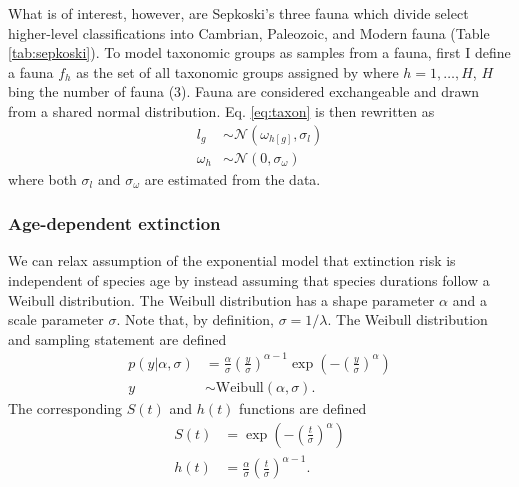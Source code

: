 \documentclass[12pt,letterpaper]{article}
\begin{document}
What is of interest, however, are Sepkoski's three fauna \citep{SepkoskiJr.1981a} which divide select higher-level classifications into Cambrian, Paleozoic, and Modern fauna (Table \ref{tab:sepkoski}). To model taxonomic groups as samples from a fauna, first I define a fauna \(f_{h}\) as the set of all taxonomic groups assigned by \citet{SepkoskiJr.1981a} where \(h = 1, \dots, H\), \(H\) bing the number of fauna (3). Fauna are considered exchangeable and drawn from a shared normal distribution. Eq. \ref{eq:taxon} is then rewritten as
\begin{equation}
  \begin{aligned}
    l_{g} &\sim \mathcal{N}(\omega_{h[g]}, \sigma_{l})\\
    \omega_{h} &\sim \mathcal{N}(0, \sigma_{\omega})
  \end{aligned}
  \label{eq:taxon_fauna}
\end{equation}
where both \(\sigma_{l}\) and \(\sigma_{\omega}\) are estimated from the data.


\subsubsection{Age-dependent extinction}

We can relax assumption of the exponential model that extinction risk is independent of species age by instead assuming that species durations follow a Weibull distribution. The Weibull distribution has a shape parameter \(\alpha\) and a scale parameter \(\sigma\). Note that, by definition, \(\sigma = 1 / \lambda\). The Weibull distribution and sampling statement are defined
\begin{equation}
  \begin{aligned}
    p(y | \alpha, \sigma) &= \frac{\alpha}{\sigma} \left(\frac{y}{\sigma}\right)^{\alpha - 1} \exp\left(-\left(\frac{y}{\sigma}\right)^{\alpha}\right) \\
    y &\sim \mathrm{Weibull}(\alpha, \sigma).
  \end{aligned}
  \label{eq:weibull}
\end{equation}
The corresponding \(S(t)\) and \(h(t)\) functions are defined
\begin{align}
  S(t) &= \exp\left(-\left(\frac{t}{\sigma}\right)^{\alpha}\right) \label{eq:wei_surv} \\
  h(t) &= \frac{\alpha}{\sigma}\left(\frac{t}{\sigma}\right)^{\alpha - 1} \label{eq:wei_haz}.
\end{align}
\end{document}
